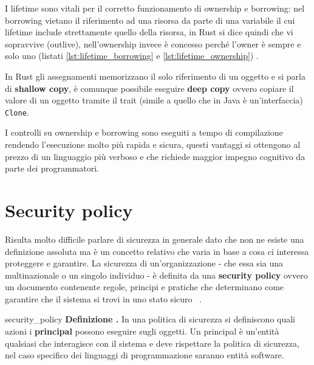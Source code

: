 \documentclass[Lau,binding=0.6cm]{sapthesis}
\newenvironment{myDefinition}[2]{ \begin{Definizione}[adjusted title=#1]{}{#2}
    \textbf{Definizione \thetcbcounter.} }{\end{Definizione}}
\begin{document}
I lifetime sono vitali per il corretto funzionamento di ownership e borrowing: nel borrowing vietano il riferimento ad una risorsa da parte di una variabile il cui lifetime include strettamente quello della risorsa, in Rust si dice quindi che vi sopravvive (outlive), nell'ownership invece è concesso perché l'owner è sempre e solo uno (listati \ref{lst:lifetime_borrowing} e \ref{lst:lifetime_ownership}) . 







In Rust gli assegnamenti memorizzano il solo riferimento di un oggetto e si parla di \textbf{shallow copy}, è comunque possibile eseguire \textbf{deep copy} ovvero copiare il valore di un oggetto tramite il trait (simile a quello che in Java è un'interfaccia) \colorbox{backcolour}{\texttt{Clone}}.

I controlli su ownership e borrowing sono eseguiti a tempo di compilazione rendendo l'esecuzione molto più rapida e sicura, questi vantaggi si ottengono al prezzo di un linguaggio più verboso e che richiede maggior impegno cognitivo da parte dei programmatori. 

\clearpage
\chapter{Security policy}

Risulta molto difficile parlare di sicurezza in generale dato che non ne esiste una definizione assoluta ma è un concetto relativo che varia in base a cosa ci interessa proteggere e garantire. La sicurezza di un'organizzazione - che essa sia una multinazionale o un singolo individuo - è definita da una \textbf{security policy}  ovvero un documento contenente regole, principi e pratiche che determinano come garantire che il sistema si trovi in uno stato sicuro ~\cite{milner:type_polymorphism}. 

\begin{myDefinition}{Security policy}{security_policy}
    In una politica di sicurezza si definiscono quali azioni i \textbf{principal} possono eseguire sugli oggetti. Un principal è un'entità qualsiasi che interagisce con il sistema e deve rispettare la politica di sicurezza, nel caso specifico dei linguaggi di programmazione saranno entità software.
\end{myDefinition}
\end{document}
